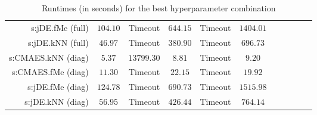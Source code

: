 \begin{table}[ht]
{\begin{tabular}{rcccccccccc}
s:jDE.fMe (full) & $104.10$ & Timeout  & $644.15$ & Timeout  & $1404.01$ \\
s:jDE.kNN (full) & $46.97$ & Timeout  & $380.90$ & Timeout  & $696.73$ \\
s:CMAES.kNN (diag) & $5.37$ & $13799.30$ & $8.81$ & Timeout  & $9.20$ \\
s:CMAES.fMe (diag) & $11.30$ & Timeout  & $22.15$ & Timeout  & $19.92$ \\
s:jDE.fMe (diag) & $124.78$ & Timeout  & $690.73$ & Timeout  & $1515.98$ \\
s:jDE.kNN (diag) & $56.95$ & Timeout  & $426.44$ & Timeout  & $764.14$ \\


\bottomrule
\end{tabular}
}
\caption{Runtimes (in seconds) for the best hyperparameter combination} \label{tab:runtimes}
\end{table}
